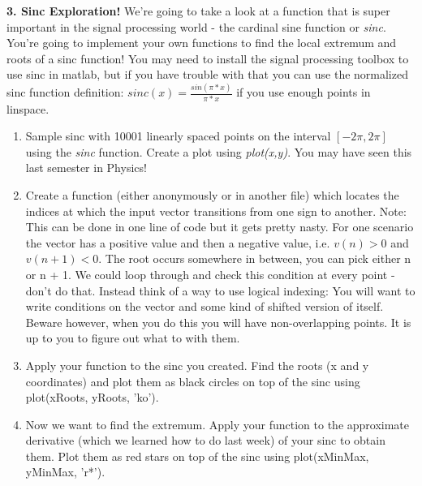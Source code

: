 \documentclass[11pt]{article}
\newenvironment{qparts}{\begin{enumerate}[{(}a{)}]}{\end{enumerate}}
\begin{document}
 \noindent \textbf{3. Sinc Exploration!} We're going to take a look at a function that is super important in the signal processing world - the cardinal sine function or \emph{sinc}. You're going to implement your own functions to find the local extremum and roots of a sinc function! You may need to install the signal processing toolbox to use sinc in matlab, but if you have trouble with that you can use the normalized sinc function definition: $sinc(x) = \frac{sin(\pi*x)}{\pi*x}$ if you use enough points in linspace. 
 \begin{qparts}
 \item Sample sinc with 10001 linearly spaced points on the interval $[-2\pi, 2\pi]$ using the \emph{sinc} function. Create a plot using \emph{plot(x,y)}. You may have seen this last semester in Physics!
 \item Create a function (either anonymously or in another file) which locates the indices at which the input vector transitions from one sign to another. Note: This can be done in one line of code but it gets pretty nasty. For one scenario the vector has a positive value and then a negative value, i.e. $v(n) > 0$ and $v(n + 1) < 0$. The root occurs somewhere in between, you can pick either n or n + 1. We could loop through and check this condition at every point - don’t do that. Instead think of a way to use logical indexing: You will want to write conditions on the vector and some kind of shifted version of itself. Beware however, when you do this you will have non-overlapping points. It is up to you to figure out what to with them. 
 
 \item Apply your function to the sinc you created. Find the roots (x and y coordinates) and plot them as black circles on top of the sinc using plot(xRoots, yRoots, 'ko'). 
 \item Now we want to find the extremum. Apply your function to the approximate derivative (which we learned how to do last week) of your sinc to obtain them. Plot them as red stars on top of the sinc using plot(xMinMax, yMinMax, 'r*'). 
 \end{qparts}
\end{document}
